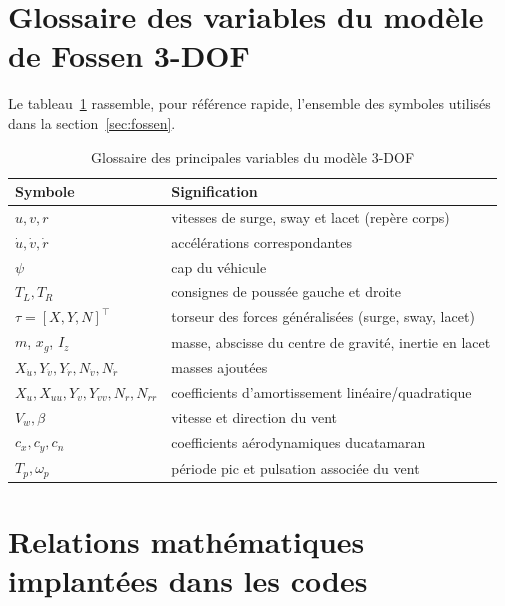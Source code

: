 \documentclass{rapportEILCO}
\begin{document}
	\begin{appendix}
		
		
		
		
		
		\section{Glossaire des variables du modèle de Fossen 3-DOF}
		\label{ann:glossaire}
		Le tableau~\ref{tab:glossaire} rassemble, pour référence rapide, l'ensemble des symboles utilisés dans
		la section~\ref{sec:fossen}.
		
		\begin{table}[H]
			\centering
			\caption{Glossaire des principales variables du modèle 3-DOF}
			\label{tab:glossaire}
			\begin{tabular}{ll}
				\toprule
				\textbf{Symbole} & \textbf{Signification} \\
				\midrule
				$u, v, r$ & vitesses de surge, sway et lacet (repère corps) \\
				$\dot u, \dot v, \dot r$ & accélérations correspondantes \\
				$\psi$ & cap du véhicule \\
				$T_L, T_R$ & consignes de poussée gauche et droite \\
				$\tau = [X, Y, N]^\top$ & torseur des forces généralisées (surge, sway, lacet) \\
				$m$, $x_g$, $I_z$ & masse, abscisse du centre de gravité, inertie en lacet \\
				$X_{\dot u}, Y_{\dot v}, Y_{\dot r}, N_{\dot v}, N_{\dot r}$ & masses ajoutées \\
				$X_u, X_{uu}, Y_v, Y_{vv}, N_r, N_{rr}$ & coefficients d'amortissement linéaire/quadratique \\
				$V_w, \beta$ & vitesse et direction du vent \\
				$c_x, c_y, c_n$ & coefficients aérodynamiques ducatamaran \\
				$T_p, \omega_p$ & période pic et pulsation associée du vent \\
				\bottomrule
			\end{tabular}
		\end{table}
		

		\section{Relations mathématiques implantées dans les codes}
		\label{app:formulaires}
		

\end{appendix}
\end{document}
